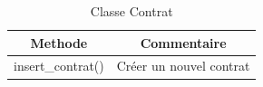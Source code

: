 \documentclass{report}
\begin{document}
\begin{table}[h!]
    \begin{center}
        \begin{tabular}{|c|c|}
            \hline
            \textbf{Methode} & \textbf{Commentaire}  \\
            \hline
            insert\_contrat() & Créer un nouvel contrat\\
            \hline
        \end{tabular}
    \end{center}
\caption{Classe Contrat}
\end{table}
\end{document}
